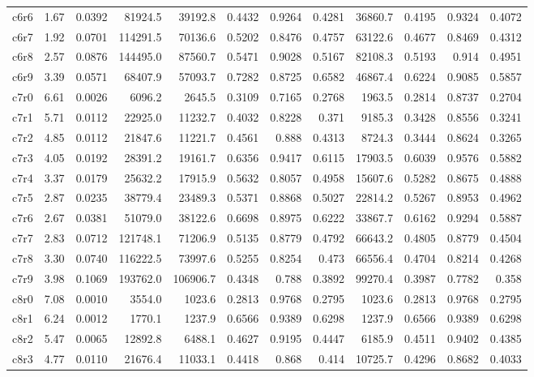 \begin{landscape}
\begin{longtable}[]{@{}lrrrrrrrrrrr@{}}
c6r6 & 1.67 & 0.0392 & 81924.5 & 39192.8 & 0.4432 & 0.9264 & 0.4281 & 36860.7 & 0.4195 & 0.9324 & 0.4072 \\
c6r7 & 1.92 & 0.0701 & 114291.5 & 70136.6 & 0.5202 & 0.8476 & 0.4757 & 63122.6 & 0.4677 & 0.8469 & 0.4312 \\
c6r8 & 2.57 & 0.0876 & 144495.0 & 87560.7 & 0.5471 & 0.9028 & 0.5167 & 82108.3 & 0.5193 & 0.914 & 0.4951 \\
c6r9 & 3.39 & 0.0571 & 68407.9 & 57093.7 & 0.7282 & 0.8725 & 0.6582 & 46867.4 & 0.6224 & 0.9085 & 0.5857 \\
c7r0 & 6.61 & 0.0026 & 6096.2 & 2645.5 & 0.3109 & 0.7165 & 0.2768 & 1963.5 & 0.2814 & 0.8737 & 0.2704 \\
c7r1 & 5.71 & 0.0112 & 22925.0 & 11232.7 & 0.4032 & 0.8228 & 0.371 & 9185.3 & 0.3428 & 0.8556 & 0.3241 \\
c7r2 & 4.85 & 0.0112 & 21847.6 & 11221.7 & 0.4561 & 0.888 & 0.4313 & 8724.3 & 0.3444 & 0.8624 & 0.3265 \\
c7r3 & 4.05 & 0.0192 & 28391.2 & 19161.7 & 0.6356 & 0.9417 & 0.6115 & 17903.5 & 0.6039 & 0.9576 & 0.5882 \\
c7r4 & 3.37 & 0.0179 & 25632.2 & 17915.9 & 0.5632 & 0.8057 & 0.4958 & 15607.6 & 0.5282 & 0.8675 & 0.4888 \\
c7r5 & 2.87 & 0.0235 & 38779.4 & 23489.3 & 0.5371 & 0.8868 & 0.5027 & 22814.2 & 0.5267 & 0.8953 & 0.4962 \\
c7r6 & 2.67 & 0.0381 & 51079.0 & 38122.6 & 0.6698 & 0.8975 & 0.6222 & 33867.7 & 0.6162 & 0.9294 & 0.5887 \\
c7r7 & 2.83 & 0.0712 & 121748.1 & 71206.9 & 0.5135 & 0.8779 & 0.4792 & 66643.2 & 0.4805 & 0.8779 & 0.4504 \\
c7r8 & 3.30 & 0.0740 & 116222.5 & 73997.6 & 0.5255 & 0.8254 & 0.473 & 66556.4 & 0.4704 & 0.8214 & 0.4268 \\
c7r9 & 3.98 & 0.1069 & 193762.0 & 106906.7 & 0.4348 & 0.788 & 0.3892 & 99270.4 & 0.3987 & 0.7782 & 0.358 \\
c8r0 & 7.08 & 0.0010 & 3554.0 & 1023.6 & 0.2813 & 0.9768 & 0.2795 & 1023.6 & 0.2813 & 0.9768 & 0.2795 \\
c8r1 & 6.24 & 0.0012 & 1770.1 & 1237.9 & 0.6566 & 0.9389 & 0.6298 & 1237.9 & 0.6566 & 0.9389 & 0.6298 \\
c8r2 & 5.47 & 0.0065 & 12892.8 & 6488.1 & 0.4627 & 0.9195 & 0.4447 & 6185.9 & 0.4511 & 0.9402 & 0.4385 \\
c8r3 & 4.77 & 0.0110 & 21676.4 & 11033.1 & 0.4418 & 0.868 & 0.414 & 10725.7 & 0.4296 & 0.8682 & 0.4033 \\

\end{longtable}
\end{landscape}
